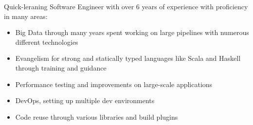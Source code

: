 

\begin{cvparagraph}


Quick-leraning Software Engineer with over 6 years of experience with proficiency in many areas:
\begin{itemize}
  \setlength\itemsep{-0.5em}
  \item{Big Data through many years spent working on large pipelines with numerous different technologies}
  \item{Evangelism for strong and statically typed languages like Scala and Haskell through training and guidance}
  \item{Performance testing and improvements on large-scale applications}
  \item{DevOps, setting up multiple dev environments}
  \item{Code reuse through various libraries and build plugins}
\end{itemize}

\end{cvparagraph}
